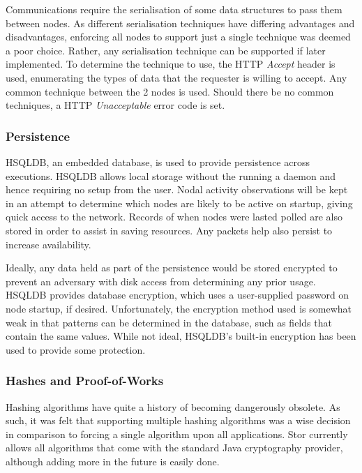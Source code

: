			Communications require the serialisation of some data structures to pass them between nodes. As different serialisation techniques have differing advantages and disadvantages, enforcing all nodes to support just a single technique was deemed a poor choice. Rather, any serialisation technique can be supported if later implemented. To determine the technique to use, the HTTP \textit{Accept} header is used, enumerating the types of data that the requester is willing to accept. Any common technique between the 2 nodes is used. Should there be no common techniques, a HTTP \textit{Unacceptable} error code is set.
			
	
		\subsubsection*{Persistence}
			HSQLDB, an embedded database, is used to provide persistence across executions. HSQLDB allows local storage without the running a daemon and hence requiring no setup from the user. Nodal activity observations will be kept in an attempt to determine which nodes are likely to be active on startup, giving quick access to the network. Records of when nodes were lasted polled are also stored in order to assist in saving resources. Any packets help also persist to increase availability.
			
			Ideally, any data held as part of the persistence would be stored encrypted to prevent an adversary with disk access from determining any prior usage. HSQLDB provides database encryption, which uses a user-supplied password on node startup, if desired. Unfortunately, the encryption method used is somewhat weak in that patterns can be determined in the database, such as fields that contain the same values. While not ideal, HSQLDB's built-in encryption has been used to provide some protection.
		\subsubsection*{Hashes and Proof-of-Works}
			Hashing algorithms have quite a history of becoming dangerously obsolete. As such, it was felt that supporting multiple hashing algorithms was a wise decision in comparison to forcing a single algorithm upon all applications. Stor currently allows all algorithms that come with the standard Java cryptography provider, although adding more in the future is easily done. 
		

